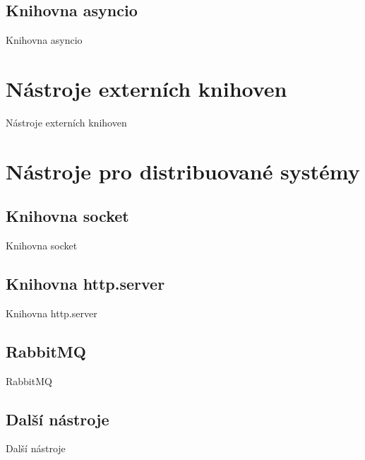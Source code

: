 \documentclass{beamer}
\begin{document}
\subsection{Knihovna asyncio}
\begin{frame}{Knihovna asyncio}

\end{frame}

\section{Nástroje externích knihoven}
\begin{frame}{Nástroje externích knihoven}

\end{frame}

\section{Nástroje pro distribuované systémy}
\subsection{Knihovna socket}
\begin{frame}{Knihovna socket}

\end{frame}

\subsection{Knihovna http.server}
\begin{frame}{Knihovna http.server}

\end{frame}

\subsection{RabbitMQ}
\begin{frame}{RabbitMQ}

\end{frame}

\subsection{Další nástroje}
\begin{frame}{Další nástroje}

\end{frame}
\end{document}
